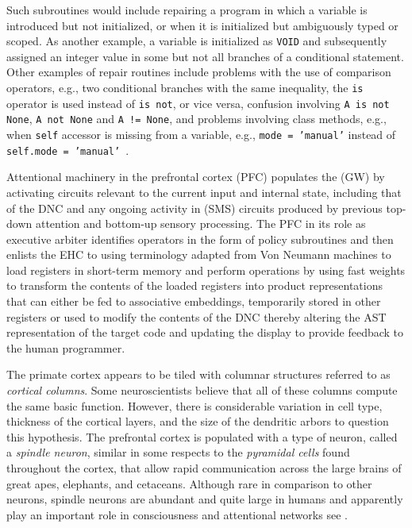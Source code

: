 Such subroutines would include repairing a program in which a variable is introduced but not initialized, or when it is initialized but ambiguously typed or scoped. As another example, a variable is initialized as {\tt{VOID}} and subsequently assigned an integer value in some but not all branches of a conditional statement. Other examples of repair routines include problems with the use of comparison operators, e.g., two conditional branches with the same inequality, the {\tt{is}} operator is used instead of {\tt{is not}}, or vice versa, confusion involving {\tt{A is not None}}, {\tt{A not None}} and {\tt{A != None}}, and problems involving class methods, e.g., when {\tt{self}} accessor is missing from a variable, e.g., {\tt{mode = 'manual'}} instead of {\tt{self.mode = 'manual'}}~\cite{ShinetalICLR-18b,DevlinetalICLR-18,WangetalCoRR-17}.

Attentional machinery in the prefrontal cortex (PFC) populates the (GW) by activating circuits relevant to the current input and internal state, including that of the DNC and any ongoing activity in (SMS) circuits produced by previous top-down attention and bottom-up sensory processing. The PFC in its role as executive arbiter identifies operators in the form of policy subroutines and then enlists the EHC to \emdash{} using terminology adapted from Von Neumann machines \emdash{} to load registers in short-term memory and perform operations by using fast weights to transform the contents of the loaded registers into product representations that can either be fed to associative embeddings, temporarily stored in other registers or used to modify the contents of the DNC thereby altering the AST representation of the target code and updating the display to provide feedback to the human programmer.

The primate cortex appears to be tiled with columnar structures referred to as {\it{cortical columns}}. Some neuroscientists believe that all of these columns compute the same basic function. However, there is considerable variation in cell type, thickness of the cortical layers, and the size of the dendritic arbors to question this hypothesis. The prefrontal cortex is populated with a type of neuron, called a {\it{spindle neuron}}, similar in some respects to the {\it{pyramidal cells}} found throughout the cortex, that allow rapid communication across the large brains of great apes, elephants, and cetaceans. Although rare in comparison to other neurons, spindle neurons are abundant and quite large in humans and apparently play an important role in consciousness and attentional networks \emdash{} see {{}}.

